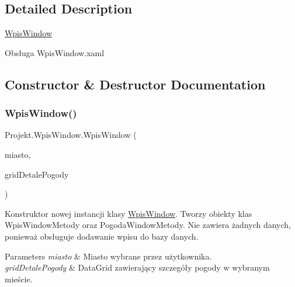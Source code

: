 \subsection{Detailed Description}
\mbox{\hyperlink{class_projekt_1_1_wpis_window}{Wpis\+Window}} 

Obsługa Wpis\+Window.\+xaml

\subsection{Constructor \& Destructor Documentation}
\mbox{\label{class_projekt_1_1_wpis_window_ad267c83d80d8d13897f36cee34a87fdf}} 
\subsubsection{\texorpdfstring{WpisWindow()}{WpisWindow()}\hspace{0.1cm}{\footnotesize\ttfamily [1/2]}}
{\footnotesize\ttfamily Projekt.\+Wpis\+Window.\+Wpis\+Window (\begin{DoxyParamCaption}\item[{string}]{miasto,  }\item[{ref Data\+Grid}]{grid\+Detale\+Pogody }\end{DoxyParamCaption})}



Konstruktor nowej instancji klasy \mbox{\hyperlink{class_projekt_1_1_wpis_window}{Wpis\+Window}}. Tworzy obiekty klas Wpis\+Window\+Metody oraz Pogoda\+Window\+Metody. Nie zawiera żadnych danych, ponieważ obsługuje dodawanie wpisu do bazy danych. 


\begin{DoxyParams}{Parameters}
{\em miasto} & Miasto wybrane przez użytkownika.\\
\hline
{\em grid\+Detale\+Pogody} & Data\+Grid zawierający szczegóły pogody w wybranym mieście.\\
\hline
\end{DoxyParams}
\mbox{\label{class_projekt_1_1_wpis_window_aa1b8fd7af282aa4eb21e34a8540c548f}} 
